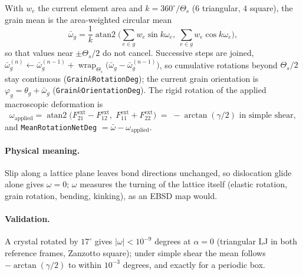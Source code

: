 \documentclass[11pt,a4paper]{article}
\newcommand{\code}[1]{\texttt{#1}}
\begin{document}
With $w_e$ the current element area and $k = 360^\circ/\Theta_s$ ($6$ triangular, $4$ square), the grain mean is the area-weighted circular mean
\begin{equation}
  \bar\omega_g = \frac{1}{k}\operatorname{atan2}\!\Big(\sum_{e\in g} w_e \sin k\omega_e,\; \sum_{e\in g} w_e \cos k\omega_e\Big),
\end{equation}
so that values near $\pm\Theta_s/2$ do not cancel. Successive steps are joined, $\bar\omega_g^{(n)} \leftarrow \bar\omega_g^{(n-1)} + \operatorname{wrap}_{\Theta_s}\!\big(\bar\omega_g - \bar\omega_g^{(n-1)}\big)$, so cumulative rotations beyond $\Theta_s/2$ stay continuous (\code{Grain$k$RotationDeg}); the current grain orientation is $\varphi_g = \theta_g + \bar\omega_g$ (\code{Grain$k$OrientationDeg}). The rigid rotation of the applied macroscopic deformation is
\begin{equation}
  \omega_{\text{applied}} = \operatorname{atan2}\!\big(F^{\text{ext}}_{21} - F^{\text{ext}}_{12},\; F^{\text{ext}}_{11} + F^{\text{ext}}_{22}\big) \;=\; -\arctan(\gamma/2) \text{ in simple shear},
\end{equation}
and \code{MeanRotationNetDeg} $= \bar\omega - \omega_{\text{applied}}$.

\paragraph{Physical meaning.} Slip along a lattice plane leaves bond directions unchanged, so dislocation glide alone gives $\omega = 0$; $\omega$ measures the turning of the lattice itself (elastic rotation, grain rotation, bending, kinking), as an EBSD map would.

\paragraph{Validation.} A crystal rotated by $17^\circ$ gives $|\omega| < 10^{-9}$ degrees at $\alpha = 0$ (triangular LJ in both reference frames, Zanzotto square); under simple shear the mean follows $-\arctan(\gamma/2)$ to within $10^{-3}$ degrees, and exactly for a periodic box.
\end{document}
